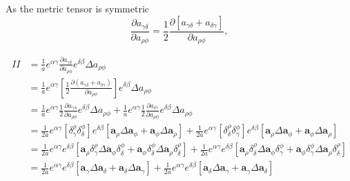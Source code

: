 \documentclass[../main.tex]{subfiles}
\begin{document}
\begin{appendices}
As the metric tensor is symmetric
\begin{equation}\label{eq:daabaab}
\frac{\partial a_{\gamma \delta}}{\partial a_{\rho \phi}} = \frac{1}{2} \frac{\partial \left[ a_{\gamma \delta}+ a_{\delta \gamma} \right]}{\partial a_{\rho \phi}},
\end{equation}

\begin{equation}\label{eq:del_a_ab_5}
    \begin{split}
        II &= \frac{1}{a} e^{\alpha \gamma} \frac{\partial a_{\gamma \delta}}{\partial a_{\rho \phi}} e^{\delta \beta} \Delta a_{\rho \phi}\\
        &= \frac{1}{a} e^{\alpha \gamma} \left[\frac{1}{2} \frac{\partial \left( a_{\gamma \delta}+ a_{\delta \gamma} \right)}{\partial a_{\rho \phi}}\right] e^{\delta \beta} \Delta a_{\rho \phi}\\    
        &= \frac{1}{a} e^{\alpha \gamma} \frac{1}{2} \frac{\partial a_{\gamma \delta}}{\partial a_{\rho \phi}} e^{\delta \beta} \Delta a_{\rho \phi} + \frac{1}{a} e^{\alpha \gamma} \frac{1}{2} \frac{\partial a_{\delta \gamma}}{\partial a_{\rho \phi}} e^{\delta \beta} \Delta a_{\rho \phi} \\
        &= \frac{1}{2a} e^{\alpha \gamma} \left[ \delta^{\rho}_{\gamma} \delta^{\phi}_{\delta} \right] e^{\delta \beta} \left[ \boldsymbol{a}_{\rho} \Delta \boldsymbol{a}_{\phi} + \boldsymbol{a}_{\phi} \Delta \boldsymbol{a}_{\rho} \right] + \frac{1}{2a} e^{\alpha \gamma} \left[ \delta^{\rho}_{\delta} \delta^{\phi}_{\gamma} \right] e^{\delta \beta} \left[ \boldsymbol{a}_{\rho} \Delta \boldsymbol{a}_{\phi} + \boldsymbol{a}_{\phi} \Delta \boldsymbol{a}_{\rho} \right] \\
        &= \frac{1}{2a} e^{\alpha \gamma} e^{\delta \beta} \left[ \boldsymbol{a}_{\rho} \delta^{\rho}_{\gamma} \Delta \boldsymbol{a}_{\phi} \delta^{\phi}_{\delta} + \boldsymbol{a}_{\phi} \delta^{\phi}_{\delta} \Delta \boldsymbol{a}_{\rho} \delta^{\rho}_{\delta} \right] + \frac{1}{2a} e^{\alpha \gamma} e^{\delta \beta} \left[ \boldsymbol{a}_{\rho} \delta^{\rho}_{\delta} \Delta \boldsymbol{a}_{\phi} \delta^{\phi}_{\gamma} + \boldsymbol{a}_{\phi} \delta^{\phi}_{\gamma} \Delta \boldsymbol{a}_{\rho} \delta^{\rho}_{\delta} \right] \\
        &= \frac{1}{2a} e^{\alpha \gamma} e^{\delta \beta} \left[ \boldsymbol{a}_{\gamma} \Delta \boldsymbol{a}_{\delta} + \boldsymbol{a}_{\delta} \Delta \boldsymbol{a}_{\gamma} \right] + \frac{1}{2a} e^{\alpha \gamma} e^{\delta \beta} \left[ \boldsymbol{a}_{\delta} \Delta \boldsymbol{a}_{\gamma} + \boldsymbol{a}_{\gamma} \Delta \boldsymbol{a}_{\delta} \right] \\

\end{split}
\end{equation}
\end{appendices}
\end{document}
